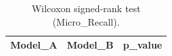 \begin{table}[t]
\centering
\begin{tabular}{lll}
\toprule
Model_A & Model_B & p_value \\
\midrule
\bottomrule
\end{tabular}
\caption{Wilcoxon signed-rank test (Micro_Recall).}
\label{tab:wilcoxon_Micro_Recall}
\end{table}